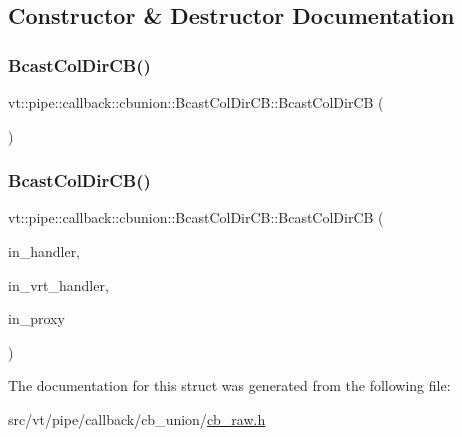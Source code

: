 \subsection{Constructor \& Destructor Documentation}
\mbox{\label{structvt_1_1pipe_1_1callback_1_1cbunion_1_1_bcast_col_dir_c_b_a38d5f3f68d4ca7752835cae912d4f3a7}} 
\subsubsection{\texorpdfstring{Bcast\+Col\+Dir\+C\+B()}{BcastColDirCB()}\hspace{0.1cm}{\footnotesize\ttfamily [1/2]}}
{\footnotesize\ttfamily vt\+::pipe\+::callback\+::cbunion\+::\+Bcast\+Col\+Dir\+C\+B\+::\+Bcast\+Col\+Dir\+CB (\begin{DoxyParamCaption}{ }\end{DoxyParamCaption})\hspace{0.3cm}{\ttfamily [default]}}

\mbox{\label{structvt_1_1pipe_1_1callback_1_1cbunion_1_1_bcast_col_dir_c_b_a08e4af70634c11290b65670e8e294e77}} 
\subsubsection{\texorpdfstring{Bcast\+Col\+Dir\+C\+B()}{BcastColDirCB()}\hspace{0.1cm}{\footnotesize\ttfamily [2/2]}}
{\footnotesize\ttfamily vt\+::pipe\+::callback\+::cbunion\+::\+Bcast\+Col\+Dir\+C\+B\+::\+Bcast\+Col\+Dir\+CB (\begin{DoxyParamCaption}\item[{\hyperlink{namespacevt_af64846b57dfcaf104da3ef6967917573}{Handler\+Type} const}]{in\+\_\+handler,  }\item[{\hyperlink{structvt_1_1pipe_1_1callback_1_1_callback_proxy_bcast_direct_a543cd86434430bd048952534f4fbc128}{Callback\+Proxy\+Bcast\+Direct\+::\+Auto\+Handler\+Type} const}]{in\+\_\+vrt\+\_\+handler,  }\item[{\hyperlink{namespacevt_a1b417dd5d684f045bb58a0ede70045ac}{Virtual\+Proxy\+Type} const \&}]{in\+\_\+proxy }\end{DoxyParamCaption})\hspace{0.3cm}{\ttfamily [inline]}}



The documentation for this struct was generated from the following file\+:\begin{DoxyCompactItemize}
\item 
src/vt/pipe/callback/cb\+\_\+union/\hyperlink{cb__raw_8h}{cb\+\_\+raw.\+h}\end{DoxyCompactItemize}

